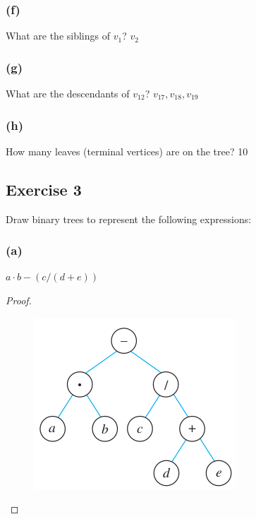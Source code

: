 \documentclass[14pt]{extarticle}
\begin{document}
\subsubsection{(f)}
What are the siblings of \(v_1\)?
\hspace{2cm}{\it Proof.} \(v_2\)

\subsubsection{(g)}
What are the descendants of \(v_{12}\)?
\hspace{2cm}{\it Proof.} \(v_{17}, v_{18}, v_{19}\)

\subsubsection{(h)}
How many leaves (terminal vertices) are on the tree?
\hspace{2cm}{\it Proof.} 10

\subsection{Exercise 3}
Draw binary trees to represent the following expressions:

\subsubsection{(a)}
\(a \cdot b - (c/(d + e))\)

\begin{proof}
    \begin{figure}[ht!]
        \centering
        \includegraphics[scale=0.6]{../images/10.5.3.a.png}
    \end{figure}
\end{proof}
\end{document}

